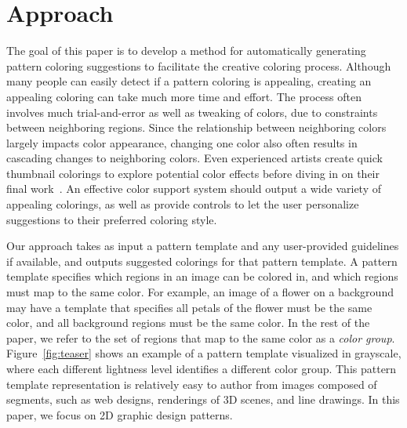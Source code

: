 \section{Approach}
\label{sec:approach}


The goal of this paper is to develop a method for automatically generating pattern coloring suggestions to facilitate the creative coloring process. Although many people can easily detect if a pattern coloring is appealing, creating an appealing coloring can take much more time and effort. The process often involves much trial-and-error as well as tweaking of colors, due to constraints between neighboring regions. Since the relationship between neighboring colors largely impacts color appearance, changing one color also often results in cascading changes to neighboring colors. Even experienced artists create quick thumbnail colorings to explore potential color effects before diving in on their final work~\cite{ColorPaletteTools}. An effective color support system should output a wide variety of appealing colorings, as well as provide controls to let the user personalize suggestions to their preferred coloring style.


Our approach takes as input a pattern template and any user-provided guidelines if available, and outputs suggested colorings for that pattern template. A pattern template specifies which regions in an image can be colored in, and which regions must map to the same color. For example, an image of a flower on a background may have a template that specifies all petals of the flower must be the same color, and all background regions must be the same color. In the rest of the paper, we refer to the set of regions that map to the same color as a \emph{color group}. Figure~\ref{fig:teaser} shows an example of a pattern template visualized in grayscale, where each different lightness level identifies a different color group. This pattern template representation is relatively easy to author from images composed of segments, such as web designs, renderings of 3D scenes, and line drawings. In this paper, we focus on 2D graphic design patterns. 

